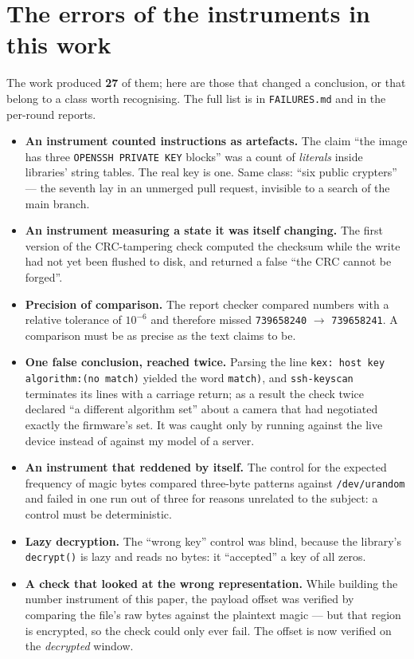 \documentclass[12pt]{article}
\newcommand{\code}[1]{\texttt{\small #1}}
\newcommand{\lc}[1]{\texttt{\small #1}}
\begin{document}
\section{The errors of the instruments in this work}
\label{sec:errors}

The work produced \textbf{27} of them; here are those that changed a conclusion, or that
belong to a class worth recognising. The full list is in \code{FAILURES.md} and in the
per-round reports.

\begin{itemize}
\item \textbf{An instrument counted instructions as artefacts.} The claim ``the image has
three \lc{OPENSSH \allowbreak PRIVATE \allowbreak KEY} blocks'' was a count of \emph{literals} inside libraries'
string tables. The real key is one. Same class: ``six public crypters'' --- the seventh lay in
an unmerged pull request, invisible to a search of the main branch.
\item \textbf{An instrument measuring a state it was itself changing.} The first version of
the CRC-tampering check computed the checksum while the write had not yet been flushed to
disk, and returned a false ``the CRC cannot be forged''.
\item \textbf{Precision of comparison.} The report checker compared numbers with a relative
tolerance of $10^{-6}$ and therefore missed \code{739658240} $\rightarrow$ \code{739658241}.
A comparison must be as precise as the text claims to be.
\item \textbf{One false conclusion, reached twice.} Parsing the line
\lc{kex: hos\allowbreak t key al\allowbreak gorithm:\allowbreak (no mat\allowbreak ch)} yielded the word \code{match)}, and
\code{ssh-keyscan} terminates its lines with a carriage return; as a result the check twice
declared ``a different algorithm set'' about a camera that had negotiated exactly the
firmware's set. It was caught only by running against the live device instead of against my
model of a server.
\item \textbf{An instrument that reddened by itself.} The control for the expected frequency
of magic bytes compared three-byte patterns against \code{/dev/urandom} and failed in one run
out of three for reasons unrelated to the subject: a control must be deterministic.
\item \textbf{Lazy decryption.} The ``wrong key'' control was blind, because the library's
\code{decrypt()} is lazy and reads no bytes: it ``accepted'' a key of all zeros.
\item \textbf{A check that looked at the wrong representation.} While building the number
instrument of this paper, the payload offset was verified by comparing the file's raw bytes
against the plaintext magic --- but that region is encrypted, so the check could only ever
fail. The offset is now verified on the \emph{decrypted} window.
\end{itemize}
\end{document}
